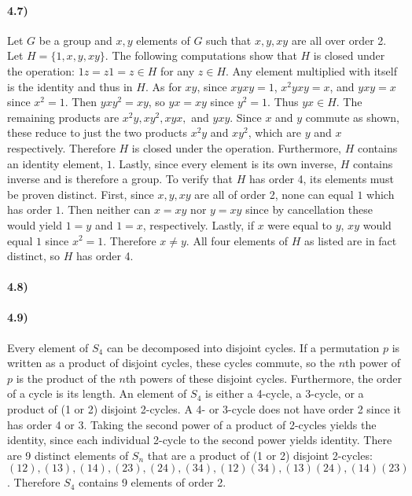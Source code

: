 \documentclass{article}
\begin{document}
\paragraph{4.7)}
Let $G$ be a group and $x,y$ elements of $G$ such that $x, y, xy$ are all over order 2. Let $H=\{1,x,y,xy\}$. The following computations show that $H$ is closed under the operation: $1z=z1=z\in H$ for any $z\in H$. Any element multiplied with itself is the identity and thus in $H$. As for $xy$, since $xyxy=1$, $x^2yxy=x$, and $yxy=x$ since $x^2=1$. Then $yxy^2=xy$, so $yx=xy$ since $y^2=1$. Thus $yx\in H$. The remaining products are $x^2y,xy^2,xyx,$ and $yxy$. Since $x$ and $y$ commute as shown, these reduce to just the two products $x^2y$ and $xy^2$, which are $y$ and $x$ respectively. Therefore $H$ is closed under the operation. Furthermore, $H$ contains an identity element, $1$. Lastly, since every element is its own inverse, $H$ contains inverse and is therefore a group.\newline
To verify that $H$ has order 4, its elements must be proven distinct. First, since $x,y,xy$ are all of order 2, none can equal $1$ which has order $1$. Then neither can $x=xy$ nor $y=xy$ since by cancellation these would yield $1=y$ and $1=x$, respectively. Lastly, if $x$ were equal to $y$, $xy$ would equal $1$ since $x^2=1$. Therefore $x\ne y$. All four elements of $H$  as listed are in fact distinct, so $H$ has order 4.

\paragraph{4.8)}

\paragraph{4.9)}
Every element of $S_4$ can be decomposed into disjoint cycles. If a permutation $p$ is written as a product of disjoint cycles, these cycles commute, so the $n$th power of $p$ is the product of the $n$th powers of these disjoint cycles. Furthermore, the order of a cycle is its length. An element of $S_4$ is either a 4-cycle, a 3-cycle, or a product of (1 or 2) disjoint  2-cycles. A 4- or 3-cycle does not have order 2 since it has order 4 or 3. Taking the second power of a product of 2-cycles yields the identity, since each individual 2-cycle to the second power yields identity. There are 9 distinct elements of $S_n$ that are a product of (1 or 2) disjoint 2-cycles: $(12),(13),(14),(23),(24),(34),(12)(34),(13)(24),(14)(23)$. Therefore $S_4$ contains 9 elements of order 2.
\end{document}
